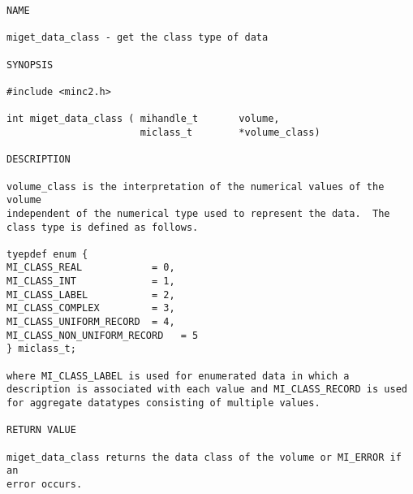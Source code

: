 \documentclass{article}
\begin{document}
\begin{verbatim}
NAME

miget_data_class - get the class type of data

SYNOPSIS

#include <minc2.h>

int miget_data_class ( mihandle_t       volume,
                       miclass_t        *volume_class) 

DESCRIPTION

volume_class is the interpretation of the numerical values of the volume
independent of the numerical type used to represent the data.  The
class type is defined as follows.

tyepdef enum {
MI_CLASS_REAL            = 0,
MI_CLASS_INT             = 1,
MI_CLASS_LABEL           = 2,
MI_CLASS_COMPLEX         = 3,
MI_CLASS_UNIFORM_RECORD  = 4,
MI_CLASS_NON_UNIFORM_RECORD   = 5
} miclass_t;

where MI_CLASS_LABEL is used for enumerated data in which a
description is associated with each value and MI_CLASS_RECORD is used
for aggregate datatypes consisting of multiple values.
 
RETURN VALUE

miget_data_class returns the data class of the volume or MI_ERROR if an 
error occurs.
\end{verbatim}
\end{document}
